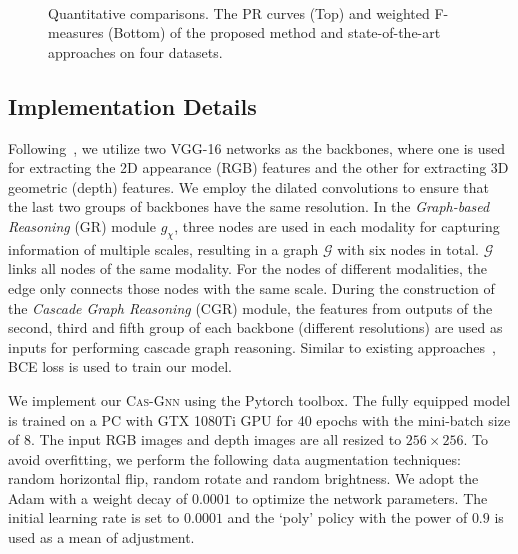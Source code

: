 \documentclass[runningheads]{llncs}
\begin{document}
\begin{figure}[pt]
	\begin{center}
		\\
		\setcounter{subfigure}{0}
	\end{center}
	\caption{Quantitative comparisons. The PR curves (Top) and weighted F-measures (Bottom) of the proposed method and state-of-the-art approaches on four datasets.}
	\label{fig:sub}
\end{figure}
\subsection{Implementation Details}	
Following~\cite{fan2019rethinking,Chen_2018_CVPR,chen2019multi,han2017cnns}, we utilize two VGG-16 networks as the backbones, where one is used for extracting the 2D appearance (RGB) features and the other for extracting 3D geometric (depth) features. We employ the dilated convolutions to ensure that the last two groups of backbones have the same resolution. In the {\em Graph-based Reasoning} (GR) module $g_{\chi}$, three nodes are used in each modality for capturing information of multiple scales, resulting in a graph $\mathcal G$ with six nodes in total. $\mathcal G$ links all nodes of the same modality. For the nodes of different modalities, the edge only connects those nodes with the same scale. During the construction of the {\em Cascade Graph Reasoning} (CGR) module, the features from outputs of the second, third and fifth group of each backbone (different resolutions) are used as inputs for performing cascade graph reasoning. Similar to existing approaches~\cite{Chen_2018_CVPR,chen2019multi,han2017cnns}, BCE loss is used to train our model.

We implement our {\scshape{Cas-Gnn}} using the Pytorch toolbox. The fully equipped model is trained on a PC with GTX 1080Ti GPU for 40 epochs with the mini-batch size of $8$. The input RGB images and depth images are all resized to $256 \times 256$. To avoid overfitting, we perform the following data augmentation techniques: random horizontal flip, random rotate and random brightness. We adopt the Adam with a weight decay of $0.0001$ to optimize the network parameters. The initial learning rate is set to $0.0001$ and the `poly' policy with the power of $0.9$ is used as a mean of adjustment.
\end{document}
